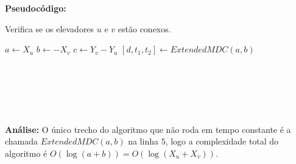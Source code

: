 \textbf{Pseudocódigo:}
\begin{algorithm}
\caption{Verifica se os elevadores $u$ e $v$ estão conexos.}\label{euclid}
\begin{algorithmic}[1]
\State $a \gets X_u$
\State $b \gets -X_v$
\State $c \gets Y_v-Y_u$
\State $[d,t_1,t_2] \gets ExtendedMDC(a,b)$
\\
\State {}
\EndIf
\\
\State {}
\EndIf
\\
\\
\\
\State {}
\EndIf
\\
\State {}

\EndProcedure
\end{algorithmic}
\end{algorithm}

\textbf{Análise:}
O único trecho do algoritmo que não roda em tempo constante é a chamada $ExtendedMDC(a,b)$ na linha $5$, logo a complexidade total do algoritmo é $O(\log(a+b)) = O(\log(X_u+X_v))$.
